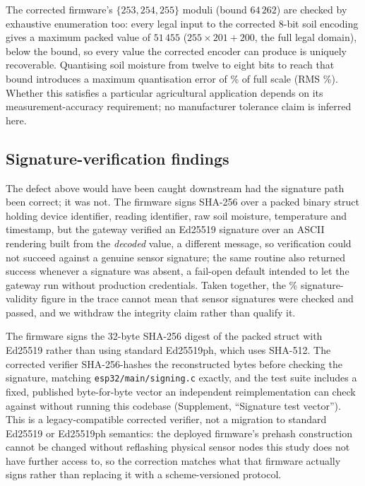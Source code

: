 \documentclass[a4paper,fleqn]{cas-dc}
\begin{document}
The corrected firmware's $\{253, 254, 255\}$ moduli (bound $64\,262$) are
checked by exhaustive enumeration too: every legal input to the corrected
8-bit soil encoding gives a maximum packed value of $51\,455$
($255 \times 201 + 200$, the full legal domain), below the bound, so
every value the corrected encoder can produce is uniquely recoverable.
Quantising soil moisture from twelve to eight bits to reach that bound
introduces a maximum quantisation error of \QuantErrMaxPct\% of full
scale (RMS \QuantErrRMSPct\%). Whether this satisfies a particular
agricultural application depends on its measurement-accuracy requirement;
no manufacturer tolerance claim is inferred here.

\subsection{Signature-verification findings}
\label{subsec:pm_signature}

The defect above would have been caught downstream had the signature path
been correct; it was not. The firmware signs SHA-256 over a packed binary
struct holding device identifier, reading identifier, raw soil moisture,
temperature and timestamp, but the gateway verified an Ed25519 signature
over an ASCII rendering built from the \emph{decoded} value, a different
message, so verification could not succeed against a genuine sensor
signature; the same routine also returned success whenever a signature
was absent, a fail-open default intended to let the gateway run without
production credentials. Taken together, the \SigValidPct\%
signature-validity figure in the trace cannot mean that sensor signatures
were checked and passed, and we withdraw the integrity claim rather than
qualify it.

The firmware signs the 32-byte SHA-256 digest of the packed struct with
Ed25519 rather than using standard Ed25519ph, which uses SHA-512.
The corrected verifier SHA-256-hashes the reconstructed bytes
before checking the signature, matching \texttt{esp32/main/signing.c}
exactly, and the test suite includes a fixed, published byte-for-byte
vector an independent reimplementation can check against without running
this codebase (Supplement, ``Signature test vector''). This is a
legacy-compatible corrected verifier, not a migration to standard
Ed25519 or Ed25519ph semantics: the deployed firmware's prehash
construction cannot be changed without reflashing physical sensor nodes
this study does not have further access to, so the correction matches
what that firmware actually signs rather than replacing it with a
scheme-versioned protocol.
\end{document}
